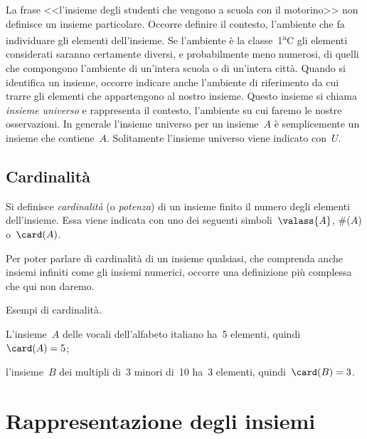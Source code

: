 La frase <<l'insieme degli studenti che vengono a scuola con il motorino>> non definisce un
insieme particolare. Occorre definire il contesto, l'ambiente che fa individuare gli elementi
dell'insieme. Se l'ambiente è la classe~1\textsuperscript{a}C gli elementi considerati saranno certamente diversi, e probabilmente meno numerosi, di quelli che compongono l'ambiente di un'intera scuola o di un'intera
città. Quando si identifica un insieme, occorre indicare anche l'ambiente di riferimento da cui trarre gli elementi che appartengono al nostro insieme. Questo insieme si chiama \emph{insieme universo} e rappresenta il contesto, l'ambiente su cui faremo le nostre osservazioni. In generale l'insieme universo per un insieme~$A$ è semplicemente un insieme che contiene~$A$. Solitamente l'insieme universo viene indicato con~$U$.

\subsection{Cardinalità}

\begin{definizione}
 Si definisce \emph{cardinalità} (o \emph{potenza}) di un insieme finito il numero
degli elementi dell'insieme. Essa viene indicata con uno dei seguenti simboli~$\valass{A}$, \#($A$) o~$\card(A)$.
\end{definizione}

Per poter parlare di cardinalità di un insieme qualsiasi, che
comprenda anche insiemi infiniti come gli insiemi numerici, occorre una
definizione più complessa che qui non daremo.

\begin{exrig}
 \begin{esempio}
 Esempi di cardinalità.
 \begin{enumeratea}
  \item L'insieme~$A$ delle vocali dell'alfabeto italiano ha~5 elementi, quindi~$\card(A)=5$;
  \item l'insieme~$B$ dei multipli di~3 minori di~10 ha~3 elementi, quindi~$\card(B)=3$.
 \end{enumeratea}
 \end{esempio}
\end{exrig}

\ovalbox{\risolvii \ref{ese:5.9}, \ref{ese:5.10}, \ref{ese:5.11}, \ref{ese:5.12}, \ref{ese:5.13}, \ref{ese:5.14}}

\section{Rappresentazione degli insiemi}

